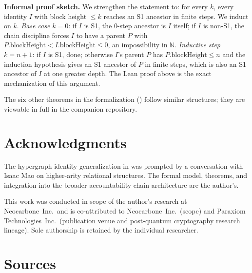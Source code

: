 \documentclass[11pt,a4paper,parskip=half-,DIV=12,headings=standardclasses]{scrartcl}
\theoremstyle{ncthm}
\theoremstyle{ncdef}
\begin{document}
\noindent\textbf{Informal proof sketch.} We strengthen the statement
to: for every $k$, every identity $I$ with block height $\leq k$
reaches an S1 ancestor in finite steps. We induct on $k$. \emph{Base
case} $k=0$: if $I$ is S1, the 0-step ancestor is $I$ itself; if $I$
is non-S1, the chain discipline forces $I$ to have a parent $P$ with
$P.\text{blockHeight} < I.\text{blockHeight} \leq 0$, an impossibility
in $\mathbb{N}$. \emph{Inductive step} $k = n+1$: if $I$ is S1, done;
otherwise $I$'s parent $P$ has $P.\text{blockHeight} \leq n$ and the
induction hypothesis gives an S1 ancestor of $P$ in finite steps,
which is also an S1 ancestor of $I$ at one greater depth. The Lean
proof above is the exact mechanization of this argument.

The six other theorems in the formalization
() follow similar structures; they are
viewable in full in the companion repository.

\section*{Acknowledgments}\label{sec:acknowledgments}

The hypergraph identity generalization in  was
prompted by a conversation with Isaac Mao on higher-arity relational
structures. The formal model, theorems, and integration into the broader
accountability-chain architecture are the author's.

This work was conducted in scope of the author's research at
Neocarbone~Inc.\ and is co-attributed to Neocarbone~Inc.\ (scope) and
Paraxiom Technologies~Inc.\ (publication venue and post-quantum
cryptography research lineage). Sole authorship is retained by the
individual researcher.

\section{Sources}\label{app:sources}
\end{document}
